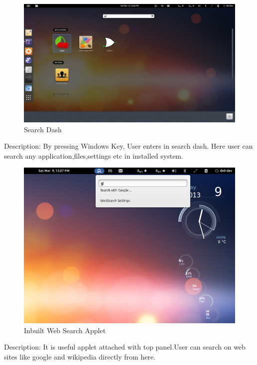 \newpage
\begin{figure}[h]
\begin{center}
  \includegraphics[scale=0.33] {3.png}
  \caption[Screenshot - Search Dash in DMLinux]{Search Dash}
\end{center}
\end{figure}
Description: By pressing Windows Key, User enters in search dash. Here user can search any application,files,settings etc in installed system.

\newpage


\begin{figure}[h]
\begin{center}
  \includegraphics[scale=0.4] {4.png}
  \caption[Screenshot - Web search Applet]{Inbuilt Web Search Applet}
\end{center}
\end{figure}
Description: It is useful applet attached with top panel.User can search on web sites like google and wikipedia directly from here.


